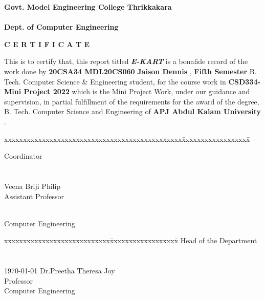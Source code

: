 \documentclass[11pt]{report}
\begin{document}
\begin{titlepage}
\begin{center}
\Large{\textbf{Govt. Model Engineering College Thrikkakara}}\\
\Large{\textbf{\\Dept. of Computer Engineering}}\\
\end{center}
\begin{figure}[h]
\begin{center}
\end{center}
\end{figure}
\begin{center}
\Large{\textbf{C E R T I F I C A T E}}\\
\vspace{.1in}
\end{center}
This is to certify that, this report titled \textbf{\textit {E-KART}} is a bonafide record of the work done by
{\textbf{20CSA34
MDL20CS060
}{\textbf{Jaison Dennis}}} {{, \textbf{Fifth Semester} B. Tech. Computer Science \& Engineering }}
student,  for the course work in \textbf{CSD334-Mini Project 2022} which is the Mini Project Work, under our guidance and supervision, in partial 
 fulfillment of the requirements for the award of the degree, B. Tech. Computer 
Science  and Engineering of \textbf{APJ Abdul Kalam University }.
\vspace{.1in}
\begin{tabbing}
xxxxxxxxxxxxxxxxxxxxxxxxxxxxxxxxxxxxxxxxxxxxxxx\= xxxxxxxxxxxxxxxxxx\= \kill

			\>				Coordinator
\\
\\
\\
  \>Veena Briji Philip\\
	\>Assistant Professor
	
	 \\
	\>	Computer Engineering
\end{tabbing}
\vspace{.08in}
%
\begin{tabbing}
xxxxxxxxxxxxxxxxxxxxxxxxxxxx\= xxxxxxxxxxxxxxxxxx\= \kill
			\>Head of the Department \\
\\
\\
\today
\>Dr.Preetha Theresa Joy\\
\>Professor\\
\>Computer Engineering\\
\end{tabbing}
\end{titlepage}
\end{document}
